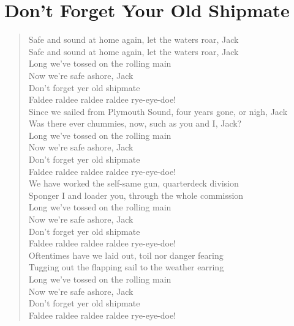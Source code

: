 \documentclass[11pt]{article}
\begin{document}
\section{Don't Forget Your Old Shipmate}
\label{sec:org8649e25}
\begin{verse}
Safe and sound at home again, let the waters roar, Jack\\
Safe and sound at home again, let the waters roar, Jack\\
\vspace*{1em}
Long we've tossed on the rolling main\\
Now we're safe ashore, Jack\\
Don't forget yer old shipmate\\
Faldee raldee raldee raldee rye-eye-doe!\\
\vspace*{1em}
Since we sailed from Plymouth Sound, four years gone, or nigh, Jack\\
Was there ever chummies, now, such as you and I, Jack?\\
Long we've tossed on the rolling main\\
Now we're safe ashore, Jack\\
Don't forget yer old shipmate\\
Faldee raldee raldee raldee rye-eye-doe!\\
\vspace*{1em}
We have worked the self-same gun, quarterdeck division\\
Sponger I and loader you, through the whole commission\\
\vspace*{1em}
Long we've tossed on the rolling main\\
Now we're safe ashore, Jack\\
Don't forget yer old shipmate\\
Faldee raldee raldee raldee rye-eye-doe!\\
\vspace*{1em}
Oftentimes have we laid out, toil nor danger fearing\\
Tugging out the flapping sail to the weather earring\\
\vspace*{1em}
Long we've tossed on the rolling main\\
Now we're safe ashore, Jack\\
Don't forget yer old shipmate\\
Faldee raldee raldee raldee rye-eye-doe!\\

\end{verse}
\end{document}
